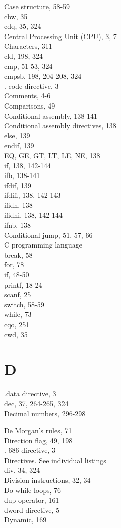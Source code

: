 \documentclass[10pt]{article}
\begin{document}
Case structure, 58-59\\
cbw, 35\\
cdq, 35, 324\\
Central Processing Unit (CPU), 3, 7\\
Characters, 311\\
cld, 198, 324\\
cmp, 51-53, 324\\
cmpsb, 198, 204-208, 324\\
. code directive, 3\\
Comments, 4-6\\
Comparisons, 49\\
Conditional assembly, 138-141\\
Conditional assembly directives, 138\\
else, 139\\
endif, 139\\
EQ, GE, GT, LT, LE, NE, 138\\
if, 138, 142-144\\
ifb, 138-141\\
ifdif, 139\\
ifdifi, 138, 142-143\\
ifidn, 138\\
ifidni, 138, 142-144\\
ifnb, 138\\
Conditional jump, 51, 57, 66\\
C programming language\\
break, 58\\
for, 78\\
if, 48-50\\
printf, 18-24\\
scanf, 25\\
switch, 58-59\\
while, 73\\
cqo, 251\\
cwd, 35

\section*{D}
.data directive, 3\\
dec, 37, 264-265, 324\\
Decimal numbers, 296-298

De Morgan's rules, 71\\
Direction flag, 49, 198\\
. 686 directive, 3\\
Directives. See individual listings\\
div, 34, 324\\
Division instructions, 32, 34\\
Do-while loops, 76\\
dup operator, 161\\
dword directive, 5\\
Dynamic, 169
\end{document}
